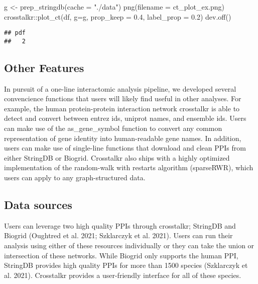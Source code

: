 \documentclass{article}
\newenvironment{Shaded}{\begin{snugshade}}{\end{snugshade}}
\newcommand{\AttributeTok}[1]{\textcolor[rgb]{0.77,0.63,0.00}{#1}}
\newcommand{\FloatTok}[1]{\textcolor[rgb]{0.00,0.00,0.81}{#1}}
\newcommand{\FunctionTok}[1]{\textcolor[rgb]{0.00,0.00,0.00}{#1}}
\newcommand{\NormalTok}[1]{#1}
\newcommand{\OtherTok}[1]{\textcolor[rgb]{0.56,0.35,0.01}{#1}}
\newcommand{\SpecialCharTok}[1]{\textcolor[rgb]{0.00,0.00,0.00}{#1}}
\newcommand{\StringTok}[1]{\textcolor[rgb]{0.31,0.60,0.02}{#1}}
\begin{document}
\begin{Shaded}
\begin{Highlighting}[]
\NormalTok{g }\OtherTok{\textless{}{-}} \FunctionTok{prep\_stringdb}\NormalTok{(}\AttributeTok{cache =} \StringTok{"./data"}\NormalTok{)}
\FunctionTok{png}\NormalTok{(}\AttributeTok{filename =} \StringTok{\textquotesingle{}ct\_plot\_ex.png\textquotesingle{}}\NormalTok{)}
\NormalTok{crosstalkr}\SpecialCharTok{::}\FunctionTok{plot\_ct}\NormalTok{(df, }\AttributeTok{g=}\NormalTok{g, }\AttributeTok{prop\_keep =} \FloatTok{0.4}\NormalTok{, }\AttributeTok{label\_prop =} \FloatTok{0.2}\NormalTok{)}
\FunctionTok{dev.off}\NormalTok{()}
\end{Highlighting}
\end{Shaded}

\begin{verbatim}
## pdf 
##   2
\end{verbatim}

\hypertarget{other-features}{%
\subsection{Other Features}\label{other-features}}

In pursuit of a one-line interactomic analysis pipeline, we developed
several convencience functions that users will likely find useful in
other analyses. For example, the human protein-protein interaction
network crosstalkr is able to detect and convert between entrez ids,
uniprot names, and ensemble ids. Users can make use of the
as\_gene\_symbol function to convert any common representation of gene
identity into human-readable gene names. In addition, users can make use
of single-line functions that download and clean PPIs from either
StringDB or Biogrid. Crosstalkr also ships with a highly optimized
implementation of the random-walk with restarts algorithm (sparseRWR),
which users can apply to any graph-structured data.

\hypertarget{data-sources}{%
\subsection{Data sources}\label{data-sources}}

Users can leverage two high quality PPIs through crosstalkr; StringDB
and Biogrid (Oughtred et al. 2021; Szklarczyk et al. 2021). Users can
run their analysis using either of these resources individually or they
can take the union or intersection of these networks. While Biogrid only
supports the human PPI, StringDB provides high quality PPIs for more
than 1500 species (Szklarczyk et al. 2021). Crosstalkr provides a
user-friendly interface for all of these species.
\end{document}
